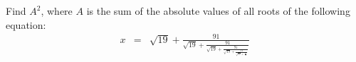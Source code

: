 Find $A^2$, where $A$ is the sum of the absolute values of all roots of the following equation: \begin{eqnarray*}x &=& \sqrt{19} + \frac{91}{{\displaystyle \sqrt{19}+\frac{91}{{\displaystyle \sqrt{19}+\frac{91}{{\displaystyle \sqrt{19}+\frac{91}{{\displaystyle \sqrt{19}+\frac{91}{x}}}}}}}}}\end{eqnarray*}